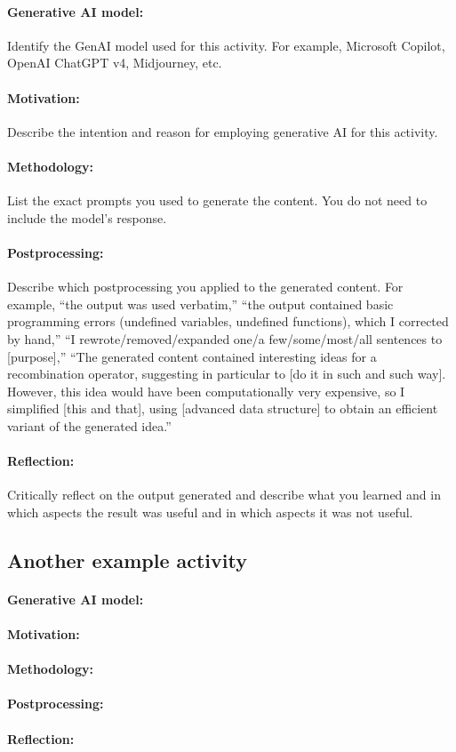 \documentclass[a4paper,10pt]{article}
\newcommand{\ReplaceMe}[1]{{\color{blue}#1}}
\begin{document}
\paragraph{Generative AI model:} \ReplaceMe{Identify the GenAI model used for this activity. For example, Microsoft Copilot, OpenAI ChatGPT v4, Midjourney, etc.}

\paragraph{Motivation:} \ReplaceMe{Describe the intention and reason for employing generative AI for this activity.}

\paragraph{Methodology:} \ReplaceMe{List the exact prompts you used to generate the content. You do not need to include the model's response.}

\paragraph{Postprocessing:} \ReplaceMe{Describe which postprocessing you applied to the generated content. For example, ``the output was used verbatim,'' ``the output contained basic programming errors (undefined variables, undefined functions), which I corrected by hand,'' ``I rewrote/removed/expanded one/a few/some/most/all sentences to [purpose],'' ``The generated content contained interesting ideas for a recombination operator, suggesting in particular to [do it in such and such way]. However, this idea would have been computationally very expensive, so I simplified [this and that], using [advanced data structure] to obtain an efficient variant of the generated idea.''}

\paragraph{Reflection:} \ReplaceMe{Critically reflect on the output generated and describe what you learned and in which aspects the result was useful and in which aspects it was not useful.}


\subsection{Another example activity} 
\paragraph{Generative AI model:}
\paragraph{Motivation:}
\paragraph{Methodology:}
\paragraph{Postprocessing:}
\paragraph{Reflection:} 
\end{document}
